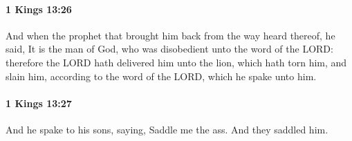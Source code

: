 		\paragraph{1 Kings 13:26} %
			\label{1KINGS-13-26}

			And when the prophet that brought him back from the way heard thereof, he said, It is the man of God, who was disobedient unto the word of the LORD: therefore the LORD hath delivered him unto the lion, which hath torn him, and slain him, according to the word of the LORD, which he spake unto him.


		\paragraph{1 Kings 13:27} %
			\label{1KINGS-13-27}

			And he spake to his sons, saying, Saddle me the ass. And they saddled him.


